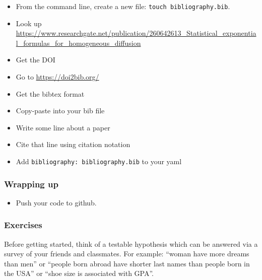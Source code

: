 \documentclass[
]{book}
\providecommand{\tightlist}{%
  \setlength{\itemsep}{0pt}\setlength{\parskip}{0pt}}
\begin{document}
\begin{itemize}
\tightlist
\item
  From the command line, create a new file: \texttt{touch\ bibliography.bib}.\\
\item
  Look up \url{https://www.researchgate.net/publication/260642613_Statistical_exponential_formulas_for_homogeneous_diffusion}\\
\item
  Get the DOI\\
\item
  Go to \url{https://doi2bib.org/}\\
\item
  Get the bibtex format\\
\item
  Copy-paste into your bib file\\
\item
  Write some line about a paper\\
\item
  Cite that line using citation notation\\
\item
  Add \texttt{bibliography:\ bibliography.bib} to your yaml
\end{itemize}

\hypertarget{wrapping-up}{%
\subsubsection*{Wrapping up}\label{wrapping-up}}

\begin{itemize}
\tightlist
\item
  Push your code to github.
\end{itemize}

\hypertarget{exercises-11}{%
\subsubsection*{Exercises}\label{exercises-11}}

Before getting started, think of a testable hypothesis which can be answered via a survey of your friends and classmates. For example: ``woman have more dreams than men'' or ``people born abroad have shorter last names than people born in the USA'' or ``shoe size is associated with GPA''.
\end{document}
